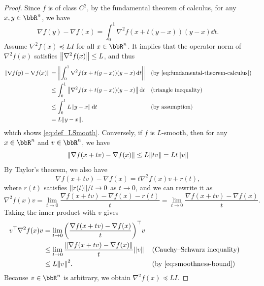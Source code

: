 \documentclass[en]{subfiles}
\begin{document}
\begin{proof}
    Since $f$ is of class $C^2$, by the fundamental theorem of calculus, for any $x,y \in \bbR^n$, we have
    \begin{equation}\label{eq:fundamental-theorem-calculus}
        \nabla f(y) - \nabla f(x)
        = \int_0^1 \nabla^2 f(x+t(y-x))(y-x) \dd{t}.
    \end{equation}
    Assume $\nabla^2 f(x)\preceq L I$ for all $x \in \bbR^n$.
    It implies that the operator norm of $\nabla^2 f(x)$ satisfies $\norm{\nabla^2 f(x)} \le L$, and thus
    \begin{align*}
        \norm{\nabla f(y) - \nabla f(x)}
         & = \norm{\int_0^1 \nabla^2 f(x+t(y-x))(y-x) \dd{t}}   &  & (\text{by \cref{eq:fundamental-theorem-calculus}}) \\
         & \le \int_0^1 \norm{\nabla^2 f(x+t(y-x))(y-x)} \dd{t} &  & (\text{triangle inequality})                       \\
         & \le \int_0^1 L\norm{y-x} \dd{t}                      &  & (\text{by assumption})                             \\
         & = L\norm{y-x},
    \end{align*}
    which shows \cref{eq:def_LSmooth}.
    Conversely, if $f$ is $L$-smooth, then for any $x \in \bbR^n$ and $v \in \bbR^n$, we have
    \begin{equation}\label{eq:smoothness-bound}
        \norm{\nabla f(x+tv)-\nabla f(x)} \le L\norm{tv} = Lt\norm{v}
    \end{equation}
    By Taylor's theorem, we also have
    \begin{equation*}
        \nabla f(x+tv)-\nabla f(x) = t \nabla^2 f(x) v + r(t),
    \end{equation*}
    where $r(t)$ satisfies $\norm{r(t)}/t \to 0$ as $t \to 0$, and we can rewrite it as
    \begin{equation}
        \nabla^2 f(x) v = \lim_{t \to 0} \frac{\nabla f(x+tv)-\nabla f(x) -r(t)}{t} = \lim_{t \to 0} \frac{\nabla f(x+tv)-\nabla f(x)}{t}.
    \end{equation}
    Taking the inner product  with $v$ gives
    \begin{align*}
        v^\top \nabla^2 f(x) v & = \lim_{t \to 0} \qty(\frac{\nabla f(x+tv)-\nabla f(x)}{t})^\top v                                                   \\
                               & \leq \lim_{t \to 0} \frac{\norm{\nabla f(x+tv)-\nabla f(x)}}{t} \norm{v} &  & (\text{Cauchy--Schwarz inequality})    \\
                               & \leq L\norm{v}^2.                                                        &  & (\text{by \cref{eq:smoothness-bound}})
    \end{align*}
    Because $v \in \bbR^n$ is arbitrary, we obtain $\nabla^2 f(x)\preceq L I$.
\end{proof}
\end{document}
